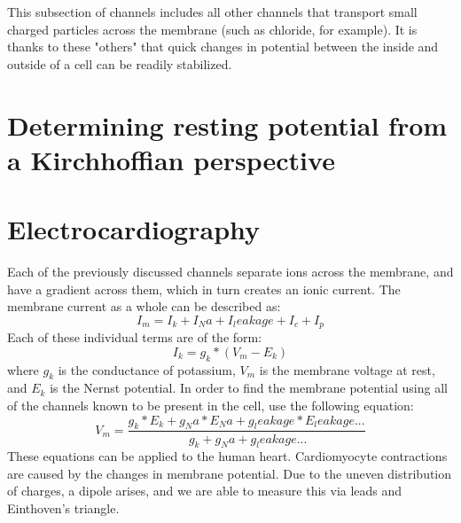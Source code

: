 \documentclass[11pt]{book}
\begin{document}
This subsection of channels includes all other channels that transport small charged particles across the membrane (such as chloride, for example). It is thanks to these "others" that quick changes in potential between the inside and outside of a cell can be readily stabilized. 





\section{Determining resting potential from a Kirchhoffian perspective}


\section{Electrocardiography}
Each of the previously discussed channels separate ions across the membrane, and have a gradient across them, which in turn creates an ionic current. The membrane current as a whole can be described as:
\begin {equation}
	I_m = I_k + I_Na + I_leakage + I_c + I_p
\end {equation}
Each of these individual terms are of the form:
\begin {equation}
	I_k = g_k * (V_m - E_k)
\end {equation}
where $g_k$ is the conductance of potassium, $V_m$ is the membrane voltage at rest, and $E_k$ is the Nernst potential. In order to find the membrane potential using all of the channels known to be present in the cell, use the following equation:
\begin {equation}
	V_m = \frac{g_k * E_k + g_Na * E_Na + g_leakage * E_leakage...} {\ g_k + g_Na + g_leakage ...}
\end {equation}
These equations can be applied to the human heart. Cardiomyocyte contractions are caused by the changes in membrane potential. Due to the uneven distribution of charges, a dipole arises, and we are able to measure this via leads and Einthoven's triangle.
\end{document}
